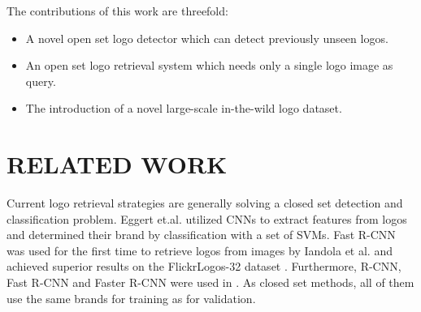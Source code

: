 \documentclass[a4paper,twoside]{article}
\newcommand{\xie}{i.e.}
\newcommand{\xeg}{e.g.}
\begin{document}
The contributions of this work are threefold:
\begin{itemize}
\item A novel open set logo detector which can detect previously unseen logos.
\item An open set logo retrieval system which needs only a single logo image as query.
\item The introduction of a novel large-scale in-the-wild logo dataset.
\end{itemize}




\section{\uppercase{Related Work}}
\noindent Current logo retrieval strategies are generally solving a closed set detection and classification problem. Eggert et.al. \cite{eggert2015} utilized \acp{CNN} to extract features from logos and determined their brand by classification with a set of \acp{SVM}. Fast R-CNN \cite{girshick2015} was used for the first time to retrieve logos from images by Iandola et al. \cite{iandola2015} and achieved superior results on the FlickrLogos-32 dataset \cite{romberg2011}. Furthermore, R-CNN, Fast R-CNN and Faster R-CNN were used in \cite{bao2016,oliveira2016,qi2017}. As closed set methods, all of them use the same brands for training as for validation.

\end{document}
